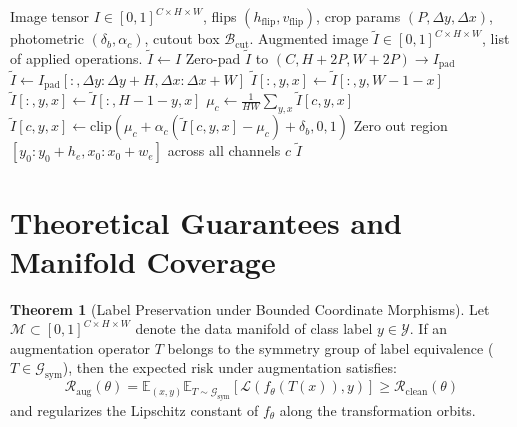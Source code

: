 \documentclass[11pt,a4paper]{article}
\theoremstyle{definition}
\newtheorem{theorem}{Theorem}[section]
\begin{document}
\begin{algorithm}[H]
\caption{Composable Image Data Augmentation Pipeline}
\label{alg:image_aug}
\begin{algorithmic}[1]
\Require Image tensor $I \in [0, 1]^{C \times H \times W}$, flips $(h_{\text{flip}}, v_{\text{flip}})$, crop params $(P, \Delta y, \Delta x)$, photometric $(\delta_b, \alpha_c)$, cutout box $\mathcal{B}_{\text{cut}}$.
\Ensure Augmented image $\tilde{I} \in [0, 1]^{C \times H \times W}$, list of applied operations.
\State $\tilde{I} \gets I$
    \State Zero-pad $\tilde{I}$ to $(C, H+2P, W+2P) \to I_{\text{pad}}$
    \State $\tilde{I} \gets I_{\text{pad}}[:, \Delta y : \Delta y + H, \Delta x : \Delta x + W]$
\EndIf
{}
    \State $\tilde{I}[:, y, x] \gets \tilde{I}[:, y, W - 1 - x]$
\EndIf
{}
    \State $\tilde{I}[:, y, x] \gets \tilde{I}[:, H - 1 - y, x]$
\EndIf
{}
        \State $\mu_c \gets \frac{1}{HW} \sum_{y, x} \tilde{I}[c, y, x]$
        \State $\tilde{I}[c, y, x] \gets \text{clip}(\mu_c + \alpha_c(\tilde{I}[c, y, x] - \mu_c) + \delta_b, 0, 1)$
    \EndFor
\EndIf
{}
    \State Zero out region $[y_0 : y_0 + h_e, x_0 : x_0 + w_e]$ across all channels $c$
\EndIf
\State \Return $\tilde{I}$
\end{algorithmic}
\end{algorithm}

\section{Theoretical Guarantees and Manifold Coverage}

\begin{theorem}[Label Preservation under Bounded Coordinate Morphisms]
Let $\mathcal{M} \subset [0, 1]^{C \times H \times W}$ denote the data manifold of class label $y \in \mathcal{Y}$. If an augmentation operator $T$ belongs to the symmetry group of label equivalence ($T \in \mathcal{G}_{\text{sym}}$), then the expected risk under augmentation satisfies:
\begin{equation}
\mathcal{R}_{\text{aug}}(\theta) = \mathbb{E}_{(x, y)} \mathbb{E}_{T \sim \mathcal{G}_{\text{sym}}} [\mathcal{L}(f_\theta(T(x)), y)] \ge \mathcal{R}_{\text{clean}}(\theta)
\end{equation}
and regularizes the Lipschitz constant of $f_\theta$ along the transformation orbits.
\end{theorem}
\end{document}
